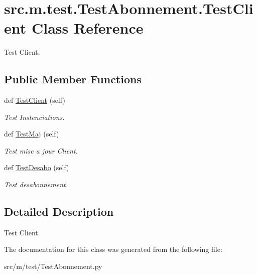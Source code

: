 \hypertarget{classsrc_1_1m_1_1test_1_1_test_abonnement_1_1_test_client}{}\section{src.\+m.\+test.\+Test\+Abonnement.\+Test\+Client Class Reference}
\label{classsrc_1_1m_1_1test_1_1_test_abonnement_1_1_test_client}


Test Client.  


\subsection*{Public Member Functions}
\begin{DoxyCompactItemize}
\item 
\hypertarget{classsrc_1_1m_1_1test_1_1_test_abonnement_1_1_test_client_ada9343de262a928a0fbca088d0b340ac}{}def \hyperlink{classsrc_1_1m_1_1test_1_1_test_abonnement_1_1_test_client_ada9343de262a928a0fbca088d0b340ac}{Test\+Client} (self)\label{classsrc_1_1m_1_1test_1_1_test_abonnement_1_1_test_client_ada9343de262a928a0fbca088d0b340ac}

\begin{DoxyCompactList}\small\item\em Test Instenciations. \end{DoxyCompactList}\item 
\hypertarget{classsrc_1_1m_1_1test_1_1_test_abonnement_1_1_test_client_a06769ea71ddaded1894abd43d10de9a9}{}def \hyperlink{classsrc_1_1m_1_1test_1_1_test_abonnement_1_1_test_client_a06769ea71ddaded1894abd43d10de9a9}{Test\+Maj} (self)\label{classsrc_1_1m_1_1test_1_1_test_abonnement_1_1_test_client_a06769ea71ddaded1894abd43d10de9a9}

\begin{DoxyCompactList}\small\item\em Test mise a jour Client. \end{DoxyCompactList}\item 
\hypertarget{classsrc_1_1m_1_1test_1_1_test_abonnement_1_1_test_client_aa681e513e99c005d490f123b859462b7}{}def \hyperlink{classsrc_1_1m_1_1test_1_1_test_abonnement_1_1_test_client_aa681e513e99c005d490f123b859462b7}{Test\+Desabo} (self)\label{classsrc_1_1m_1_1test_1_1_test_abonnement_1_1_test_client_aa681e513e99c005d490f123b859462b7}

\begin{DoxyCompactList}\small\item\em Test desabonnement. \end{DoxyCompactList}\end{DoxyCompactItemize}


\subsection{Detailed Description}
Test Client. 

The documentation for this class was generated from the following file\+:\begin{DoxyCompactItemize}
\item 
src/m/test/Test\+Abonnement.\+py\end{DoxyCompactItemize}
